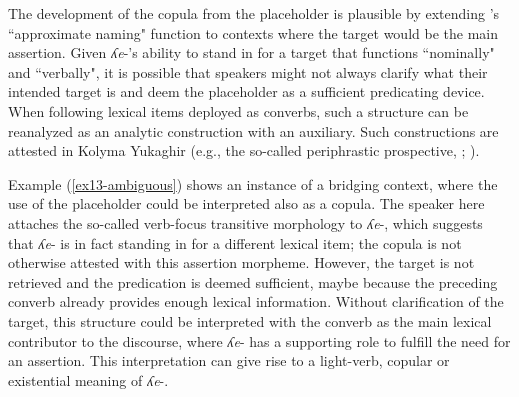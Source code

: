 \documentclass[output=paper,colorlinks,citecolor=brown
\ChapterDOI{10.5281/zenodo.15697581}
]{langscibook}
\begin{document}
The development of the copula from the placeholder is plausible by extending \citet{Podlesskaya2010}'s ``approximate naming" function to contexts where the target would be the main assertion. 
Given \textit{ʎe}-'s ability to stand in for a target that functions ``nominally" and ``verbally", it is possible that speakers might not always clarify what their intended target is and deem the placeholder as a sufficient predicating device. 
When following lexical items deployed as converbs, such a structure can be reanalyzed as an analytic construction with an auxiliary. 
Such constructions are attested in Kolyma Yukaghir (e.g., the so-called periphrastic prospective, \citealt[178]{Maslova2003}; \citealt[244]{Nagasaki2010}).


\largerpage
Example (\ref{ex13-ambiguous}) shows an instance of a bridging context, where the use of the placeholder could be interpreted also as a copula.
The speaker here attaches the so-called verb-focus transitive morphology to \textit{ʎe}-, which suggests that \textit{ʎe}- is in fact standing in for a different lexical item; the copula is not otherwise attested with this assertion morpheme. 
However, the target is not retrieved and the predication is deemed sufficient, maybe because the preceding converb already provides enough lexical information. 
Without clarification of the target, this structure could be interpreted with the converb as the main lexical contributor to the discourse, where \textit{ʎe}- has a supporting role to fulfill the need for an assertion. 
This interpretation can give rise to a light-verb, copular or existential meaning of \textit{ʎe}-. 
\end{document}
